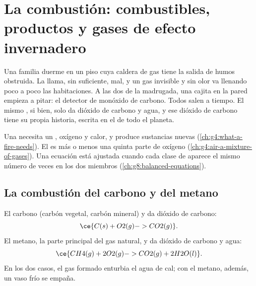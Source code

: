 \chapter{La combustión: combustibles, productos y gases de efecto invernadero}\label{ch:g8:combustion-and-fuels}

Una familia duerme en un piso cuya caldera de gas tiene la salida de
humos obstruida. La llama, sin  suficiente,  mal, y un gas
invisible y sin olor va llenando poco a poco las habitaciones. A las dos
de la madrugada, una cajita en la pared empieza a pitar: el detector de
monóxido de carbono. Todos salen a tiempo. El mismo , si 
bien, solo da dióxido de carbono y agua, y ese dióxido de carbono tiene
su propia historia, escrita en el  de todo el planeta.

\begin{recall}
Una  necesita un , oxígeno y calor, y produce
sustancias nuevas (\cref{ch:g4:what-a-fire-needs}). El  es más o
menos una quinta parte de oxígeno (\cref{ch:g4:air-a-mixture-of-gases}).
Una ecuación está ajustada cuando cada clase de  aparece el mismo
número de veces en los dos miembros
(\cref{ch:g8:balanced-equations}).
\end{recall}

\section{La combustión del carbono y del metano}

\begin{example}\label{ex:g8:combustion-and-fuels:two}
El carbono (carbón vegetal, carbón mineral)  y da dióxido de
carbono:
\[
  \ce{C(s) + O2(g) -> CO2(g)}.
\]
El metano, la parte principal del gas natural,  y da dióxido de
carbono y agua:
\[
  \ce{CH4(g) + 2O2(g) -> CO2(g) + 2H2O(l)}.
\]
En los dos casos, el gas formado enturbia el agua de cal; con el metano,
además, un vaso frío se empaña.
\end{example}

